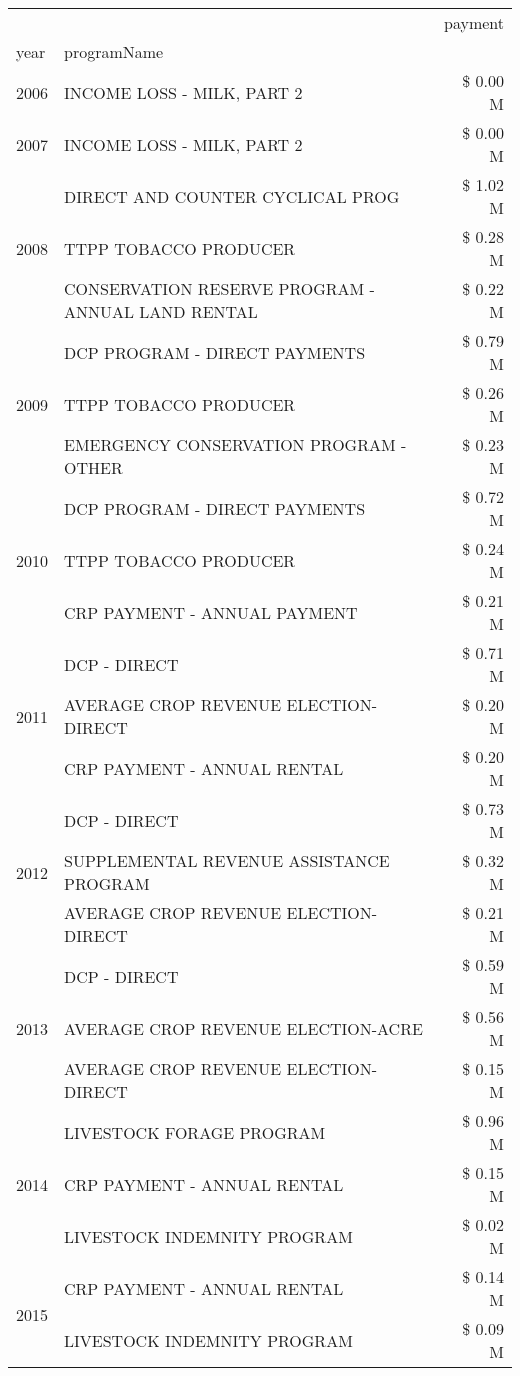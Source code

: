 \begin{tabular}{llr}
\toprule
 &  & payment \\
year & programName &  \\
\midrule
2006 & INCOME LOSS - MILK, PART 2 & \$ 0.00 M \\
\cline{1-3}
2007 & INCOME LOSS - MILK, PART 2 & \$ 0.00 M \\
\cline{1-3}
\multirow[t]{3}{*}{2008} & DIRECT AND COUNTER CYCLICAL PROG & \$ 1.02 M \\
 & TTPP TOBACCO PRODUCER & \$ 0.28 M \\
 & CONSERVATION RESERVE PROGRAM - ANNUAL LAND RENTAL & \$ 0.22 M \\
\cline{1-3}
\multirow[t]{3}{*}{2009} & DCP PROGRAM - DIRECT PAYMENTS & \$ 0.79 M \\
 & TTPP TOBACCO PRODUCER & \$ 0.26 M \\
 & EMERGENCY CONSERVATION PROGRAM - OTHER & \$ 0.23 M \\
\cline{1-3}
\multirow[t]{3}{*}{2010} & DCP PROGRAM - DIRECT PAYMENTS & \$ 0.72 M \\
 & TTPP TOBACCO PRODUCER & \$ 0.24 M \\
 & CRP PAYMENT - ANNUAL PAYMENT & \$ 0.21 M \\
\cline{1-3}
\multirow[t]{3}{*}{2011} & DCP - DIRECT & \$ 0.71 M \\
 & AVERAGE CROP REVENUE ELECTION-DIRECT & \$ 0.20 M \\
 & CRP PAYMENT - ANNUAL RENTAL & \$ 0.20 M \\
\cline{1-3}
\multirow[t]{3}{*}{2012} & DCP - DIRECT & \$ 0.73 M \\
 & SUPPLEMENTAL REVENUE ASSISTANCE PROGRAM & \$ 0.32 M \\
 & AVERAGE CROP REVENUE ELECTION-DIRECT & \$ 0.21 M \\
\cline{1-3}
\multirow[t]{3}{*}{2013} & DCP - DIRECT & \$ 0.59 M \\
 & AVERAGE CROP REVENUE ELECTION-ACRE & \$ 0.56 M \\
 & AVERAGE CROP REVENUE ELECTION-DIRECT & \$ 0.15 M \\
\cline{1-3}
\multirow[t]{3}{*}{2014} & LIVESTOCK FORAGE PROGRAM & \$ 0.96 M \\
 & CRP PAYMENT - ANNUAL RENTAL & \$ 0.15 M \\
 & LIVESTOCK INDEMNITY PROGRAM & \$ 0.02 M \\
\cline{1-3}
\multirow[t]{3}{*}{2015} & CRP PAYMENT - ANNUAL RENTAL & \$ 0.14 M \\
 & LIVESTOCK INDEMNITY PROGRAM & \$ 0.09 M \\

\end{tabular}
